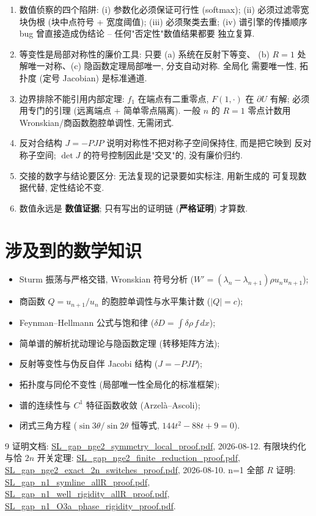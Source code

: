 \documentclass[UTF8]{ctexart}
\newcommand{\STRICT}{\textbf{严格证明}}
\newcommand{\EVIDENCE}{\textbf{数值证据}}
\begin{document}
\begin{enumerate}
	\item 数值侦察的四个陷阱: (i) 参数化必须保证可行性 (softmax);
	(ii) 必须过滤零宽块伪根 (块中点符号 + 宽度阈值); (iii) 必须聚类去重;
	(iv) 谱引擎的传播顺序 bug 曾直接造成伪结论 -- 任何"否定性"数值结果都要
	独立复算.
	\item 等变性是局部对称性的廉价工具: 只要 (a) 系统在反射下等变、
	(b) $R=1$ 处解唯一对称、(c) 隐函数定理局部唯一, 分支自动对称. 全局化
	需要唯一性, 拓扑度 (定号 Jacobian) 是标准通道.
	\item 边界排除不能引用内部定理: $f_1$ 在端点有二重零点, $F(1,\cdot)$
	在 $\partial U$ 有解; 必须用专门的引理 (远离端点 + 简单零点隔离).
	一般 $n$ 的 $R=1$ 零点计数用 Wronskian/商函数胞腔单调性, 无需闭式.
	\item 反对合结构 $J=-PJP$ 说明对称性不把对称子空间保持住, 而是把它映到
	反对称子空间; $\det J$ 的符号控制因此是"交叉"的, 没有廉价归约.
	\item 交接的数字与结论要区分: 无法复现的记录要如实标注, 用新生成的
	可复现数据代替, 定性结论不变.
	\item 数值永远是 \EVIDENCE; 只有写出的证明链 (\STRICT) 才算数.
\end{enumerate}

\section{涉及到的数学知识}

\begin{itemize}
	\item Sturm 振荡与严格交错, Wronskian 符号分析 ($W'=(\lambda_n-\lambda_{n+1})\rho u_nu_{n+1}$);
	\item 商函数 $Q=u_{n+1}/u_n$ 的胞腔单调性与水平集计数 ($|Q|=c$);
	\item Feynman--Hellmann 公式与饱和律 ($\delta D=\int\delta\rho\,f\,dx$);
	\item 简单谱的解析扰动理论与隐函数定理 (转移矩阵方法);
	\item 反射等变性与伪反自伴 Jacobi 结构 ($J=-PJP$);
	\item 拓扑度与同伦不变性 (局部唯一性全局化的标准框架);
	\item 谱的连续性与 $C^1$ 特征函数收敛 (Arzel\`a--Ascoli);
	\item 闭式三角方程 ($\sin3\theta/\sin2\theta$ 恒等式, $144t^2-88t+9=0$).
\end{itemize}

\begin{thebibliography}{9}
 证明文档: \url{SL_gap_nge2_symmetry_local_proof.pdf}, 2026-08-12.
 有限块约化与恰 $2n$ 开关定理:
\url{SL_gap_nge2_finite_reduction_proof.pdf}, \url{SL_gap_nge2_exact_2n_switches_proof.pdf}, 2026-08-10.
 n=1 全部 $R$ 证明: \url{SL_gap_n1_symline_allR_proof.pdf},
\url{SL_gap_n1_well_rigidity_allR_proof.pdf}, \url{SL_gap_n1_O3a_phase_rigidity_proof.pdf}.
\end{thebibliography}
\end{document}
